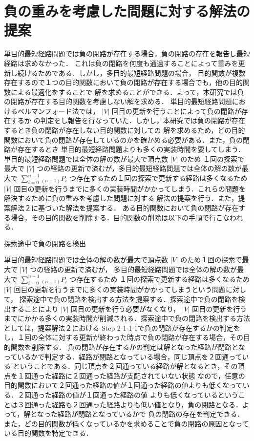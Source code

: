 \documentclass[12pt]{optlab-bachelor}
\begin{document}
\section{負の重みを考慮した問題に対する解法の提案}

単目的最短経路問題では負の閉路が存在する場合，負の閉路の存在を報告し最短経路は求めなかった．
これは負の閉路を何度も通過することによって重みを更新し続けるためである．しかし，多目的最短経路問題の場合，
目的関数が複数存在するので１つの目的関数において負の閉路が存在する場合でも，他の目的関数による最適化をすることで
解を求めることができる．よって，本研究では負の閉路が存在する目的関数を考慮しない解を求める．
単目的最短経路問題におけるベルマンフォード法では， $|V|$ 回目の更新を行うことによって負の閉路が存在するか
の判定をし報告を行なっていた．しかし，本研究では負の閉路が存在するとき負の閉路が存在しない目的関数に対しての
解を求めるため，どの目的関数において負の閉路が存在しているのかを確かめる必要がある．また，負の閉路が存在するとき
単目的最短経路問題よりも多くの実装時間を要してしまう．単目的最短経路問題では全体の解の数が最大で頂点数 $|V|$ のため
１回の探索で最大で $|V|$ つの経路の更新で済むが，多目的最短経路問題では全体の解の数が最大で
 $\displaystyle \sum_{i=0}^{n-1} {}_{(n-1)}P_i$ つ存在するため１回の探索で更新する経路は多くなるため
 $|V|$ 回目の更新を行うまでに多くの実装時間がかかってしまう．これらの問題を解決するために負の重みを考慮した問題に対する
解法の提案を行う．また，提案解法２に基づいた解法を提案する．
ある目的関数において負の閉路が存在する場合，その目的関数を削除する．目的関数の削除は以下の手順で行こなわれる．

\begin{description}
  \item[探索途中で負の閉路を検出]
\end{description}

単目的最短経路問題では全体の解の数が最大で頂点数 $|V|$ のため１回の探索で最大で $|V|$ つの経路の更新で済むが，
多目的最短経路問題では全体の解の数が最大で $\displaystyle \sum_{i=0}^{n-1} {}_{(n-1)}P_i$ つ存在するため
１回の探索で更新する経路は多くなるため $|V|$ 回目の更新を行うまでに多くの実装時間がかかってしまうという問題に対して，
探索途中で負の閉路を検出する方法を提案する．探索途中で負の閉路を検出することにより $|V|$ 回目の更新を行う必要がなくなり，
 $|V|$ 回目の更新を行うまでにかかる多くの実装時間が削減される．探索途中で負の閉路を検出する方法としては，提案解法２における
Step 2-1-1-1で負の閉路が存在するかの判定をし，１回の全体に対する更新が終わった時点で負の閉路が存在する場合，その目的関数を削除する．
負の閉路が存在するかの判定は解となった経路が閉路となっているかで判定する．経路が閉路となっている場合，同じ頂点を２回通っている
ということである．同じ頂点を２回通っている経路が解となるとき，その頂点を１回通った経路に２回通った経路が支配されていない状態
なので，任意の目的関数において２回通った経路の値が１回通った経路の値よりも低くなっている．２回通った経路の値が１回通った経路の値
よりも低くなっているということは３回通った経路も２回通った経路よりも低い値となり，負の閉路となる．よって，解となった経路が閉路となっているかで
負の閉路の存在を判定できる．また，どの目的関数が低くなっているかを求めることで負の閉路の原因となっている目的関数を特定できる．
\end{document}
